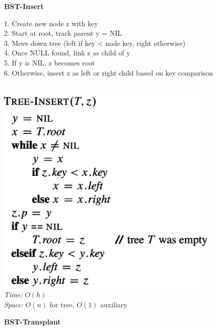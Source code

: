 {\begin{minipage}[t]{1\textwidth}
\begin{minipage}[t]{0.19\textwidth}
\begin{minipage}[t]{1.6\textwidth}
\begin{itemize}
            \end{itemize}
        \end{minipage}
    \end{minipage}
    \hfill
    \begin{minipage}[t]{0.19\textwidth}
        \centering
        \textbf{\scriptsize BST-Insert}\\[2pt]
        \scriptsize
        \begin{minipage}[t]{\textwidth}
            \scriptsize
            1. Create new node z with key\\
            2. Start at root, track parent y = NIL\\
            3. Move down tree (left if key < node key, right otherwise)\\
            4. Once NULL found, link z as child of y\\
            5. If y is NIL, z becomes root\\
            6. Otherwise, insert z as left or right child based on key comparison
        \end{minipage}\\[4pt]
        \includegraphics[width=0.8\textwidth]{images/bst-insert.png}\\[2pt]
        \textit{Time:} \(O(h)\)\\
        \textit{Space:} \(O(n)\) for tree, \(O(1)\) auxiliary
    \end{minipage}
    \hfill
    \begin{minipage}[t]{0.19\textwidth}
        \centering
        \textbf{\scriptsize BST-Transplant}\\[2pt]

\end{minipage}
\end{minipage}}
